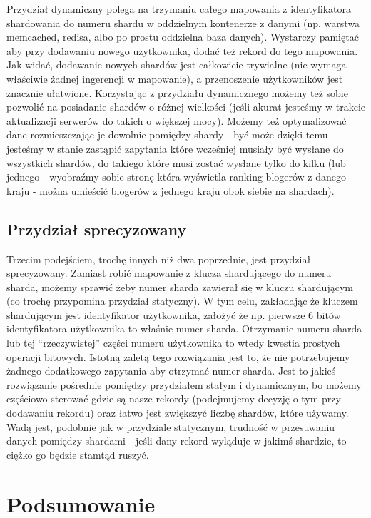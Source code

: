 \documentclass[a4paper,12pt]{article}
\begin{document}
Przydział dynamiczny polega na trzymaniu całego mapowania z identyfikatora shardowania do numeru shardu w oddzielnym kontenerze z danymi (np. warstwa memcached, redisa, albo po prostu oddzielna baza danych). Wystarczy pamiętać aby przy dodawaniu nowego użytkownika, dodać też rekord do tego mapowania. Jak widać, dodawanie nowych shardów jest całkowicie trywialne (nie wymaga właściwie żadnej ingerencji w mapowanie), a przenoszenie użytkowników jest znacznie ułatwione. Korzystając z przydziału dynamicznego możemy też sobie pozwolić na posiadanie shardów o różnej wielkości (jeśli akurat jesteśmy w trakcie aktualizacji serwerów do takich o większej mocy). Możemy też optymalizować dane rozmieszczając je dowolnie pomiędzy shardy - być może dzięki temu jesteśmy w stanie zastąpić zapytania które wcześniej musiały być wysłane do wszystkich shardów, do takiego które musi zostać wysłane tylko do kilku (lub jednego - wyobraźmy sobie stronę która wyświetla ranking blogerów z danego kraju - można umieścić blogerów z jednego kraju obok siebie na shardach).

\subsection{Przydział sprecyzowany}

Trzecim podejściem, trochę innych niż dwa poprzednie, jest przydział sprecyzowany. Zamiast robić mapowanie z klucza shardującego do numeru sharda, możemy sprawić żeby numer sharda zawierał się w kluczu shardującym (co trochę przypomina przydział statyczny). W tym celu, zakładając że kluczem shardującym jest identyfikator użytkownika, założyć że np. pierwsze 6 bitów identyfikatora użytkownika to właśnie numer sharda. Otrzymanie numeru sharda lub tej ``rzeczywistej'' części numeru użytkownika to wtedy kwestia prostych operacji bitowych. Istotną zaletą tego rozwiązania jest to, że nie potrzebujemy żadnego dodatkowego zapytania aby otrzymać numer sharda. Jest to jakieś rozwiązanie pośrednie pomiędzy przydziałem stałym i dynamicznym, bo możemy częściowo sterować gdzie są nasze rekordy (podejmujemy decyzję o tym przy dodawaniu rekordu) oraz łatwo jest zwiększyć liczbę shardów, które używamy. Wadą jest, podobnie jak w przydziale statycznym, trudność w przesuwaniu danych pomiędzy shardami - jeśli dany rekord wyląduje w jakimś shardzie, to ciężko go będzie stamtąd ruszyć.

\section{Podsumowanie}
\end{document}

